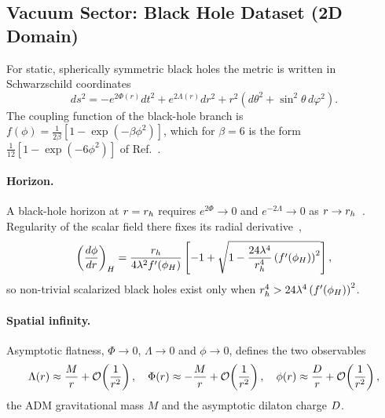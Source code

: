 \subsection{Vacuum Sector: Black Hole Dataset (2D Domain)}
\label{sec:black-holes}

For static, spherically symmetric black holes the metric is written in Schwarzschild coordinates~\citep{TODO_MetricAnsatz}
\begin{equation}
  ds^2 = -e^{2\Phi(r)} dt^2 + e^{2\Lambda(r)} dr^2 + r^2 \left( d\theta^2 + \sin^2\theta\, d\varphi^2 \right).
  \label{eq:metric}
\end{equation}
The coupling function of the black-hole branch is $f(\phi) = \frac{1}{2\beta} \left[ 1 - \exp(-\beta \phi^2) \right]$, which for $\beta = 6$ is the form $\frac{1}{12} \left[ 1 - \exp(-6\phi^2) \right]$ of Ref.~\citep{Doneva2017_BH}.

\paragraph{Horizon.}
A black-hole horizon at $r = r_h$ requires $e^{2\Phi} \to 0$ and $e^{-2\Lambda} \to 0$ as $r \to r_h$~\citep{Doneva2017_BH}. Regularity of the scalar field there fixes its radial derivative~\citep{Doneva2017_BH},
\begin{equation}
  \left( \frac{d\phi}{dr} \right)_H = \frac{r_h}{4 \lambda^2 f'(\phi_H)} \left[ -1 + \sqrt{1 - \frac{24 \lambda^4}{r_h^4} \left( f'(\phi_H) \right)^2} \right],
  \label{eq:horizon-regularity}
\end{equation}
so non-trivial scalarized black holes exist only when $r_h^4 > 24 \lambda^4 \left( f'(\phi_H) \right)^2$.

\paragraph{Spatial infinity.}
Asymptotic flatness, $\Phi \to 0$, $\Lambda \to 0$ and $\phi \to 0$, defines the two observables~\citep{Doneva2017_BH}
\begin{equation}
  \Lambda(r) \approx \frac{M}{r} + \mathcal{O}\!\left(\frac{1}{r^2}\right), \quad
  \Phi(r) \approx -\frac{M}{r} + \mathcal{O}\!\left(\frac{1}{r^2}\right), \quad
  \phi(r) \approx \frac{D}{r} + \mathcal{O}\!\left(\frac{1}{r^2}\right),
  \label{eq:asymptotics}
\end{equation}
the ADM gravitational mass $M$ and the asymptotic dilaton charge $D$.

